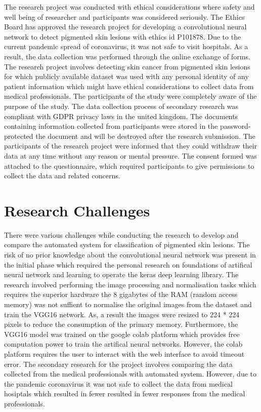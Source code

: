The research project was conducted with ethical considerations where safety and well being of researcher and participants was considered seriously. The Ethics Board has approved the research project for developing a convolutional neural network to detect pigmented skin lesions with ethics id P101878. Due to the current pandemic spread of coronavirus, it was not safe to visit hospitals. As a result, the data collection was performed through the online exchange of forms. The research project involves detecting skin cancer from pigmented skin lesions for which publicly available dataset was used with any personal identity of any patient information which might have ethical considerations to collect data from medical professionals. 
The participants of the study were completely aware of the purpose of the study. The data collection process of secondary research was compliant with GDPR privacy laws in the united kingdom. The documents containing information collected from participants were stored in the password-protected the document and will be destroyed after the research submission. The participants of the research project were informed that they could withdraw their data at any time without any reason or mental pressure. The consent formed was attached to the questionnaire, which required participants to give permissions to collect the data and related concerns.

\section{Research Challenges}
There were various challenges while conducting the research to develop and compare 
the automated system for classification of pigmented skin lesions. The risk of no 
prior knowledge about the convolutional neural network was present in the initial phase 
which required the personal research on foundations of artifical neural network and 
learning to operate the keras deep learning library. The research involved performing 
the image processing and normalisation tasks which requires the superior hardware 
the 8 gigabytes of the RAM (random access memory) was not suffient to normalise the 
original images from the dataset and train the VGG16 network. As, a result the images were resized to 224 * 224 pixels to 
reduce the consumption of the primary memory. Furthermore, the VGG16 model was 
trained on the google colab platform which provides free computation power to 
train the artifical neural networks. However, the colab platform requires the user  to 
interact with the web interface to avoid timeout error. The secondary research for the 
project involves comparing the data collected from the medical professionals with 
automated system. However, due to the pandemic coronavirus it was not safe to 
collect the data from medical hosiptals which resulted in fewer resulted in fewer 
responses from the medical professionals.

